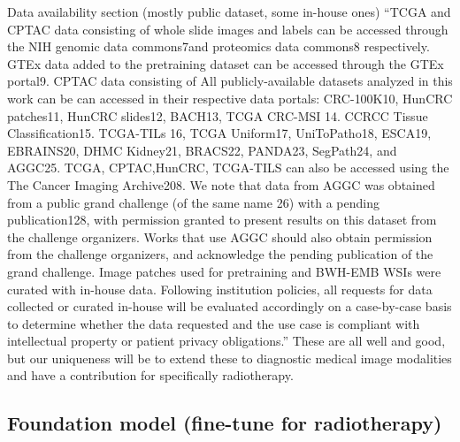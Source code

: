 \documentclass{article}%
\begin{document}
\newline%
\newline%
%
Data availability section (mostly public dataset, some in{-}house ones) %
\newline%
\newline%
%
“TCGA and CPTAC data consisting of whole slide images and labels can be accessed through the NIH genomic data commons7and proteomics data commons8 respectively. GTEx data added to the pretraining dataset can be accessed through the GTEx portal9. CPTAC data consisting of All publicly{-}available datasets analyzed in this work can be can accessed in their respective data portals: CRC{-}100K10, HunCRC patches11, HunCRC slides12, BACH13, TCGA CRC{-}MSI 14. CCRCC Tissue Classification15. TCGA{-}TILs 16, TCGA Uniform17, UniToPatho18, ESCA19, EBRAINS20, DHMC Kidney21, BRACS22, PANDA23, SegPath24, and AGGC25. TCGA, CPTAC,HunCRC, TCGA{-}TILS can also be accessed using the The Cancer Imaging Archive208. We note that data from AGGC was obtained from a public grand challenge (of the same name 26) with a pending publication128, with permission granted to present results on this dataset from the challenge organizers. Works that use AGGC should also obtain permission from the challenge organizers, and acknowledge the pending publication of the grand challenge. Image patches used for pretraining and BWH{-}EMB WSIs were curated with in{-}house data. Following institution policies, all requests for data collected or curated in{-}house will be evaluated accordingly on a case{-}by{-}case basis to determine whether the data requested and the use case is compliant with intellectual property or patient privacy obligations.”%
\newline%
\newline%
%
These are all well and good, but our uniqueness will be to extend these to diagnostic medical image modalities and have a contribution for specifically radiotherapy. %
\newline%
\newline%
%
%
\newline%
\newline%
%
\subsection{Foundation model (fine{-}tune for radiotherapy) }%
\label{subsec:Foundationmodel(fine{-}tuneforradiotherapy)}%
\end{document}
